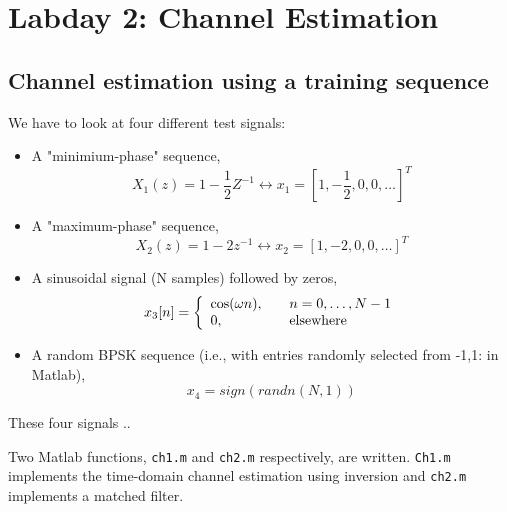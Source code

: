 \documentclass[final]{scrreprt} %
\begin{document}
\chapter{Labday 2: Channel Estimation}
\label{ch:ass1}

\section{Channel estimation using a training sequence}

We have to look at four different test signals:

\begin{itemize}
\item 	A "minimium-phase" sequence, 
\begin{equation}
X_1(z) = 1 - \dfrac{1}{2}Z^{-1} \leftrightarrow x_1 = [1, -\dfrac{1}{2}, 0, 0,  \dots]^T
\end{equation}
\item A "maximum-phase" sequence,
\begin{equation}
X_2(z) = 1 - 2z^{-1} \leftrightarrow x_2 = [1, -2, 0, 0, \dots]^T
\end{equation}
\item A sinusoidal signal (N samples) followed by zeros,
\[ x_3[n] = \left\{ 
  \begin{array}{l l}
    \cos(\omega n), & \quad n = 0, \dots ,N - 1\\
    0, & \quad \textrm{elsewhere}
  \end{array} \right.\]
\item A random BPSK sequence (i.e., with entries randomly selected from {-1,1}: in Matlab),
\begin{equation}
x_4 = sign(randn(N,1))
\end{equation}
\end{itemize}

These four signals ..

Two Matlab functions, \texttt{ch1.m} and \texttt{ch2.m} respectively, are written. 
\texttt{Ch1.m} implements the time-domain channel estimation using inversion and \texttt{ch2.m} implements a matched filter.
\end{document}
